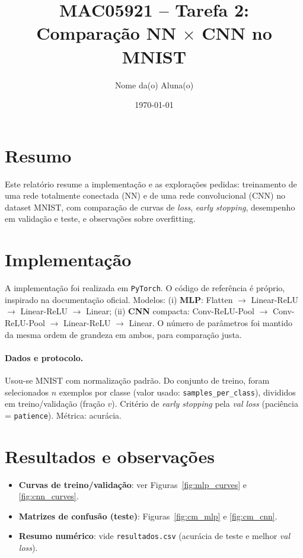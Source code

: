 \documentclass[11pt,a4paper]{article}
\title{MAC05921 -- Tarefa 2: Comparação NN $\times$ CNN no MNIST}
\author{Nome da(o) Aluna(o)}
\date{\today}
\begin{document}
\maketitle

\section*{Resumo}
Este relatório resume a implementação e as explorações pedidas: treinamento de uma rede totalmente conectada (NN) e de uma rede convolucional (CNN) no dataset MNIST, com comparação de curvas de \emph{loss}, \emph{early stopping}, desempenho em validação e teste, e observações sobre overfitting.

\section*{Implementação}
A implementação foi realizada em \texttt{PyTorch}. O código de referência é próprio, inspirado na documentação oficial. Modelos:
(i) \textbf{MLP}: Flatten $\rightarrow$ Linear-ReLU $\rightarrow$ Linear-ReLU $\rightarrow$ Linear;
(ii) \textbf{CNN} compacta: Conv-ReLU-Pool $\rightarrow$ Conv-ReLU-Pool $\rightarrow$ Linear-ReLU $\rightarrow$ Linear.
O número de parâmetros foi mantido da mesma ordem de grandeza em ambos, para comparação justa.

\paragraph{Dados e protocolo.}
Usou-se MNIST com normalização padrão. Do conjunto de treino, foram selecionados $n$ exemplos por classe (valor usado: \texttt{samples\_per\_class}), divididos em treino/validação (fração $v$).
Critério de \emph{early stopping} pela \emph{val loss} (paciência = \texttt{patience}). Métrica: acurácia.

\section*{Resultados e observações}
\begin{itemize}
  \item \textbf{Curvas de treino/validação}: ver Figuras~\ref{fig:mlp_curves} e \ref{fig:cnn_curves}.
  \item \textbf{Matrizes de confusão (teste)}: Figuras~\ref{fig:cm_mlp} e \ref{fig:cm_cnn}.
  \item \textbf{Resumo numérico}: vide \texttt{resultados.csv} (acurácia de teste e melhor \emph{val loss}).
\end{itemize}
\end{document}
